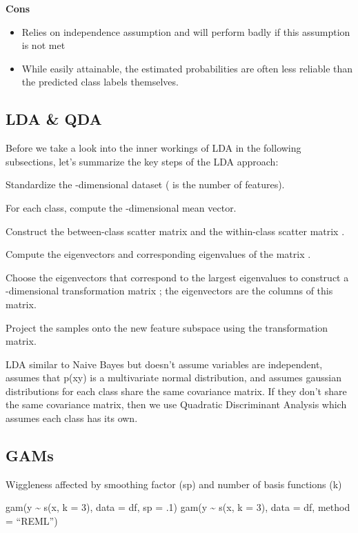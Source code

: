 \documentclass[]{book}
\begin{document}
\textbf{Cons}

\begin{itemize}
\item
  Relies on independence assumption and will perform badly if this assumption is not met
\item
  While easily attainable, the estimated probabilities are often less reliable than the predicted class labels themselves.
\end{itemize}

\hypertarget{lda-qda}{%
\subsection{LDA \& QDA}\label{lda-qda}}

Before we take a look into the inner workings of LDA in the following subsections, let's summarize the key steps of the LDA approach:

Standardize the -dimensional dataset ( is the number of features).

For each class, compute the -dimensional mean vector.

Construct the between-class scatter matrix and the within-class scatter matrix .

Compute the eigenvectors and corresponding eigenvalues of the matrix .

Choose the eigenvectors that correspond to the largest eigenvalues to construct a -dimensional transformation matrix ; the eigenvectors are the columns of this matrix.

Project the samples onto the new feature subspace using the transformation matrix.

LDA similar to Naive Bayes but doesn't assume variables are independent, assumes that p(x\textbar{}y) is a multivariate normal distribution, and assumes gaussian distributions for each class share the same covariance matrix. If they don't share the same covariance matrix, then we use Quadratic Discriminant Analysis which assumes each class has its own.

\hypertarget{gams}{%
\subsection{GAMs}\label{gams}}

Wiggleness affected by smoothing factor (sp) and number of basis functions (k)

gam(y \textasciitilde{} s(x, k = 3), data = df, sp = .1)
gam(y \textasciitilde{} s(x, k = 3), data = df, method = ``REML'')
\end{document}
